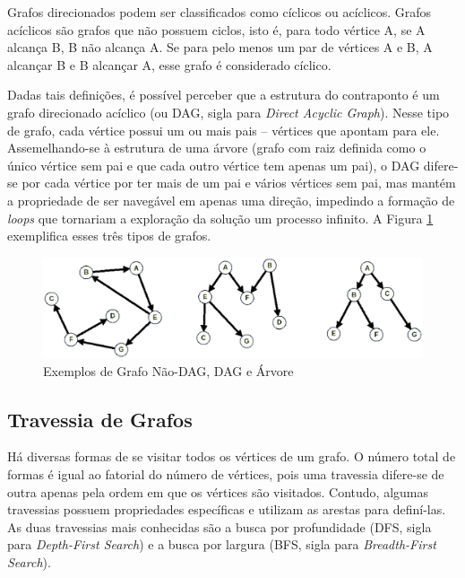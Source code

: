       Grafos direcionados podem ser classificados como cíclicos ou acíclicos. Grafos acíclicos são grafos que não possuem ciclos, isto é, para todo vértice A, se A alcança B, B não alcança A. Se para pelo menos um par de vértices A e B, A alcançar B e B alcançar A, esse grafo é considerado cíclico.

      Dadas tais definições, é possível perceber que a estrutura do contraponto é um grafo direcionado acíclico (ou DAG, sigla para \textit{Direct Acyclic Graph}). Nesse tipo de grafo, cada vértice possui um ou mais pais -- vértices que apontam para ele. Assemelhando-se à estrutura de uma árvore (grafo com raiz definida como o único vértice sem pai e que cada outro vértice tem apenas um pai), o DAG difere-se por cada vértice por ter mais de um pai e vários vértices sem pai, mas mantém a propriedade de ser navegável em apenas uma direção, impedindo a formação de \textit{loops} que tornariam a exploração da solução um processo infinito. A Figura \ref{naodagdagarvore} exemplifica esses três tipos de grafos.

      \begin{figure}[htb]
        \centering
        \includegraphics[scale=0.47]{figuras/naodagdagarvore.eps}
        \caption{Exemplos de Grafo Não-DAG, DAG e Árvore}
        \label{naodagdagarvore}
      \end{figure}

    \subsection[Travessia de Grafos]{Travessia de Grafos}

      Há diversas formas de se visitar todos os vértices de um grafo. O número total de formas é igual ao fatorial do número de vértices, pois uma travessia difere-se de outra apenas pela ordem em que os vértices são visitados. Contudo, algumas travessias possuem propriedades específicas e utilizam as arestas para definí-las. As duas travessias mais conhecidas são a busca por profundidade (DFS, sigla para \textit{Depth-First Search}) e a busca por largura (BFS, sigla para \textit{Breadth-First Search}).

